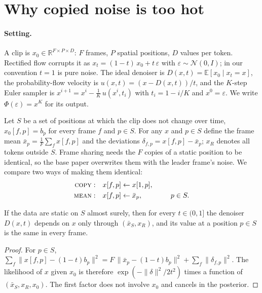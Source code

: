 \section{Why copied noise is too hot}
\label{sec:theory}

\paragraph{Setting.}
A clip is $x_0\in\mathbb{R}^{F\times P\times D}$: $F$ frames, $P$ spatial positions, $D$ values per token.
Rectified flow corrupts it as $x_t=(1-t)\,x_0+t\,\varepsilon$ with $\varepsilon\sim\mathcal{N}(0,I)$; in our convention $t=1$ is pure noise.
The ideal denoiser is $D(x,t)=\mathbb{E}[x_0\mid x_t=x]$, the probability-flow velocity is $u(x,t)=(x-D(x,t))/t$, and the $K$-step Euler sampler is
$x^{i+1}=x^{i}-\tfrac1K\,u(x^{i},t_i)$ with $t_i=1-i/K$ and $x^{0}=\varepsilon$.
We write $\Phi(\varepsilon)=x^{K}$ for its output.

Let $S$ be a set of positions at which the clip does not change over time, $x_0[f,p]=b_p$ for every frame $f$ and $p\in S$.
For any $x$ and $p\in S$ define the frame mean $\bar x_p=\tfrac1F\sum_f x[f,p]$ and the deviations $\delta_{f,p}=x[f,p]-\bar x_p$; $x_R$ denotes all tokens outside $S$.
Frame sharing needs the $F$ copies of a static position to be identical, so the base paper overwrites them with the leader frame's noise.
We compare two ways of making them identical:
\begin{align*}
\textup{\textsc{copy}}{}:&\quad x[f,p]\leftarrow x[1,p], \\
\textup{\textsc{mean}}{}:&\quad x[f,p]\leftarrow \bar x_p, \qquad\qquad p\in S .
\end{align*}

\begin{lemma}\label{lem:suff}
If the data are static on $S$ almost surely, then for every $t\in(0,1]$ the denoiser $D(x,t)$ depends on $x$ only through $(\bar x_S,x_R)$, and its value at a position $p\in S$ is the same in every frame.
\end{lemma}
\begin{proof}
For $p\in S$, $\sum_f\|x[f,p]-(1-t)b_p\|^2=F\,\|\bar x_p-(1-t)b_p\|^2+\sum_f\|\delta_{f,p}\|^2$.
The likelihood of $x$ given $x_0$ is therefore $\exp(-\|\delta\|^2/2t^2)$ times a function of $(\bar x_S,x_R,x_0)$.
The first factor does not involve $x_0$ and cancels in the posterior.
\end{proof}

